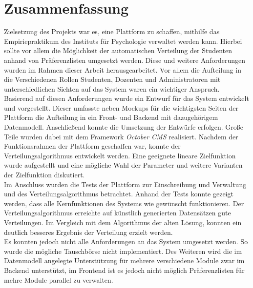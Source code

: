 \chapter{Zusammenfassung}
\label{chapter:summary}
Zielsetzung des Projekts war es, eine Plattform zu schaffen, mithilfe das Empiriepraktikum des Instituts für Psychologie verwaltet werden kann.
Hierbei sollte vor allem die Möglichkeit der automatischen Verteilung der Studenten anhand von Präferenzlisten umgesetzt werden.
Diese und weitere Anforderungen wurden im Rahmen dieser Arbeit herausgearbeitet.
Vor allem die Aufteilung in die Verschiedenen Rollen Studenten, Dozenten und Administratoren mit unterschiedlichen Sichten auf das System waren ein wichtiger Anspruch.
Basierend auf diesen Anforderungen wurde ein Entwurf für das System entwickelt und vorgestellt.
Dieser umfasste neben Mockups für die wichtigsten Seiten der Plattform die Aufteilung in ein Front- und Backend mit dazugehörigem Datenmodell.
Anschließend konnte die Umsetzung der Entwürfe erfolgen.
Große Teile wurden dabei mit dem Framework \textit{October CMS} realisiert.
Nachdem der Funktionsrahmen der Plattform geschaffen war, konnte der Verteilungsalgorithmus entwickelt werden.
Eine geeignete lineare Zielfunktion wurde aufgestellt und eine mögliche Wahl der Parameter und weitere Varianten der Zielfunktion diskutiert.\\

Im Anschluss wurden die Tests der Plattform zur Einschreibung und Verwaltung und des Verteilungsalgorithmus betrachtet.
Anhand der Tests konnte gezeigt werden, dass alle Kernfunktionen des Systems wie gewünscht funktionieren.
Der Verteilungsalgorithmus erreichte auf künstlich generierten Datensätzen gute Verteilungen.
Im Vergleich mit dem Algorithmus der alten Lösung, konnten ein deutlich besseres Ergebnis der Verteilung erzielt werden.\\

Es konnten jedoch nicht alle Anforderungen an das System umgesetzt werden.
So wurde die mögliche Tauschbörse nicht implementiert.
Des Weiteren wird die im Datenmodell angelegte Unterstützung für mehrere verschiedene Module zwar im Backend unterstützt, im Frontend ist es jedoch nicht möglich Präferenzlisten für mehre Module parallel zu verwalten.




        
    
